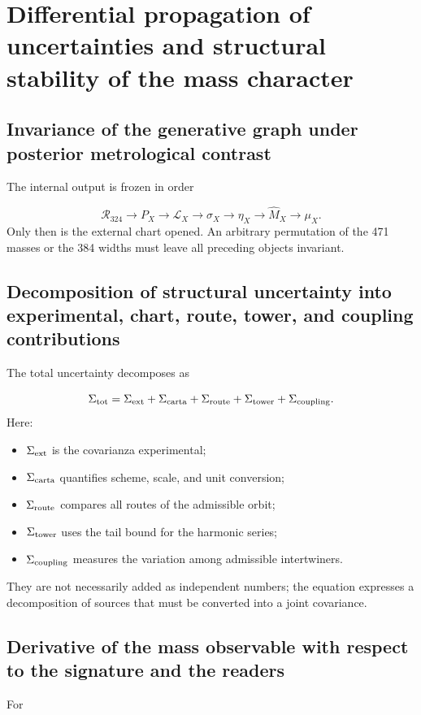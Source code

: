 \section{Differential propagation of uncertainties and structural stability of the mass character}
\subsection{Invariance of the generative graph under posterior metrological contrast}
The internal output is frozen in order

\[
 \mathcal R_{324}
 \to P_X
 \to\mathcal L_X
 \to\sigma_X
 \to\eta_X
 \to\widehat M_X
 \to\mu_X.
\]
Only then is the external chart opened. An arbitrary permutation of the 471 masses or the 384 widths must leave all preceding objects invariant.

\subsection{Decomposition of structural uncertainty into experimental, chart, route, tower, and coupling contributions}
The total uncertainty decomposes as

\[
 \Sigma_{\rm tot}
 =\Sigma_{\rm ext}
 +\Sigma_{\rm carta}
 +\Sigma_{\rm route}
 +\Sigma_{\rm tower}
 +\Sigma_{\rm coupling}.
\]
Here:

\begin{itemize}
\item \(\Sigma_{\rm ext}\) is the covarianza experimental;
\item \(\Sigma_{\rm carta}\) quantifies scheme, scale, and unit conversion;
\item \(\Sigma_{\rm route}\) compares all routes of the admissible orbit;
\item \(\Sigma_{\rm tower}\) uses the tail bound for the harmonic series;
\item \(\Sigma_{\rm coupling}\) measures the variation among admissible intertwiners.
\end{itemize}
They are not necessarily added as independent numbers; the equation expresses a decomposition of sources that must be converted into a joint covariance.

\subsection{Derivative of the mass observable with respect to the signature and the readers}
For

